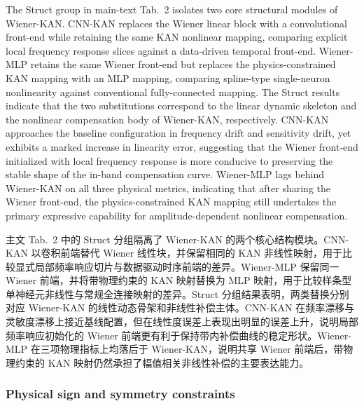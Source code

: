 \documentclass[sn-nature]{sn-jnl}
\newif\ifCNENEnglish
\newif\ifCNENBilingual
\newcommand{\CNEN}[2]{%
    \ifCNENBilingual
        #1%
        \if\relax\detokenize{#2}\relax\else\par #2\fi%
    \else
        \ifCNENEnglish
            #2%
        \else
            #1%
        \fi
    \fi
}
\begin{document}
\CNEN{主文 Tab.~2 中的 Struct 分组隔离了 Wiener-KAN 的两个核心结构模块。CNN-KAN 以卷积前端替代 Wiener 线性块，并保留相同的 KAN 非线性映射，用于比较显式局部频率响应切片与数据驱动时序前端的差异。Wiener-MLP 保留同一 Wiener 前端，并将带物理约束的 KAN 映射替换为 MLP 映射，用于比较样条型单神经元非线性与常规全连接映射的差异。Struct 分组结果表明，两类替换分别对应 Wiener-KAN 的线性动态骨架和非线性补偿主体。CNN-KAN 在频率漂移与灵敏度漂移上接近基线配置，但在线性度误差上表现出明显的误差上升，说明局部频率响应初始化的 Wiener 前端更有利于保持带内补偿曲线的稳定形状。Wiener-MLP 在三项物理指标上均落后于 Wiener-KAN，说明共享 Wiener 前端后，带物理约束的 KAN 映射仍然承担了幅值相关非线性补偿的主要表达能力。}{The Struct group in main-text Tab.~2 isolates two core structural modules of Wiener-KAN. CNN-KAN replaces the Wiener linear block with a convolutional front-end while retaining the same KAN nonlinear mapping, comparing explicit local frequency response slices against a data-driven temporal front-end. Wiener-MLP retains the same Wiener front-end but replaces the physics-constrained KAN mapping with an MLP mapping, comparing spline-type single-neuron nonlinearity against conventional fully-connected mapping. The Struct results indicate that the two substitutions correspond to the linear dynamic skeleton and the nonlinear compensation body of Wiener-KAN, respectively. CNN-KAN approaches the baseline configuration in frequency drift and sensitivity drift, yet exhibits a marked increase in linearity error, suggesting that the Wiener front-end initialized with local frequency response is more conducive to preserving the stable shape of the in-band compensation curve. Wiener-MLP lags behind Wiener-KAN on all three physical metrics, indicating that after sharing the Wiener front-end, the physics-constrained KAN mapping still undertakes the primary expressive capability for amplitude-dependent nonlinear compensation.%
}

\subsubsection{Physical sign and symmetry constraints}
\end{document}
